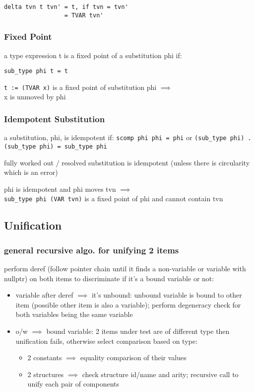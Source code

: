 \documentclass[8pt]{extarticle}
\begin{document}
\begin{multicols*}{2}
\begin{verbatim}
delta tvn t tvn' = t, if tvn = tvn'
                 = TVAR tvn'
\end{verbatim}

\subsubsection{Fixed Point}

a type expression t is a fixed point of a substitution phi if:
\begin{verbatim}
sub_type phi t = t
\end{verbatim}

\verb|t := (TVAR x)| is a fixed point of substitution phi $\implies$\\
x is unmoved by phi

\subsubsection{Idempotent Substitution}
a substitution, phi, is idempotent if:
\verb|scomp phi phi = phi| or 
\verb|(sub_type phi) . (sub_type phi) = sub_type phi|

fully worked out / resolved substitution is idempotent (unless there is circularity which is an error)

phi is idempotent and phi moves tvn $\implies$\\
\verb|sub_type phi (VAR tvn)| is a fixed point of phi and cannot contain tvn

\vfill\null
\columnbreak

\subsection{Unification}

\subsubsection{general recursive algo. for unifying 2 items}
perform deref (follow pointer chain until it finds a non-variable or variable with nullptr) on both items to discriminate if it's a bound variable or not:
\begin{itemize}
\item variable after deref $\implies$ it's unbound: unbound variable is bound to other item (possible other item is also a variable); perform degeneracy check for both variables being the same variable
\item o/w $\implies$ bound variable: 2 items under test are of different type then unification fails, otherwise select  comparison based on type:
  \begin{itemize}
    \item 2 constants $\implies$ equality comparison of their values
    \item 2 structures $\implies$ check structure id/name and arity; recursive call to unify each pair of components
  \end{itemize}
\end{itemize}


\end{multicols*}
\end{document}
